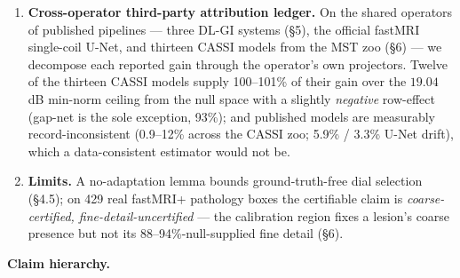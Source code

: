 \documentclass[11pt]{article}
\begin{document}
\begin{enumerate}
\item \textbf{Cross-operator third-party attribution ledger.} On the shared operators of published pipelines --- three DL-GI systems (§5), the official fastMRI single-coil U-Net, and thirteen CASSI models from the MST zoo (§6) --- we decompose each reported gain through the operator's own projectors. Twelve of the thirteen CASSI models supply 100--101\% of their gain over the $19.04$ dB min-norm ceiling from the null space with a slightly \textit{negative} row-effect (gap-net is the sole exception, 93\%); and published models are measurably record-inconsistent (0.9--12\% across the CASSI zoo; 5.9\% / 3.3\% U-Net drift), which a data-consistent estimator would not be.
\item \textbf{Limits.} A no-adaptation lemma bounds ground-truth-free dial selection (§4.5); on 429 real fastMRI+ pathology boxes the certifiable claim is \textit{coarse-certified, fine-detail-uncertified} --- the calibration region fixes a lesion's coarse presence but not its 88--94\%-null-supplied fine detail (§6).
\end{enumerate}

\medskip\noindent{}\medskip

\textbf{Claim hierarchy.}
\end{document}
